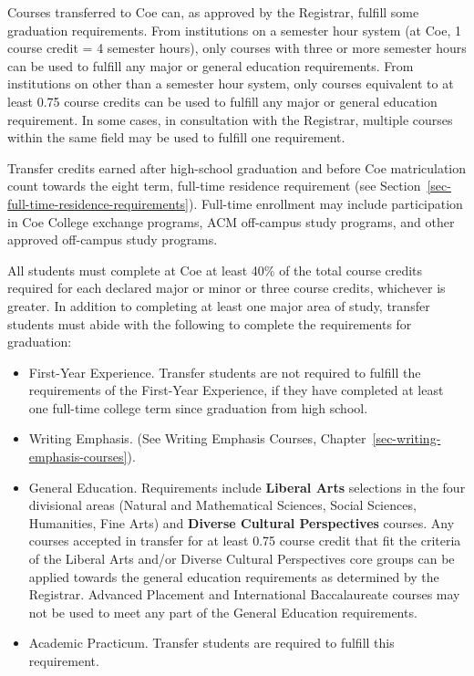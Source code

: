 \documentclass[
  letterpaper,
]{scrbook}
\providecommand{\tightlist}{%
  \setlength{\itemsep}{0pt}\setlength{\parskip}{0pt}}
\begin{document}
Courses transferred to Coe can, as approved by the Registrar, fulfill
some graduation requirements. From institutions on a semester hour
system (at Coe, 1 course credit = 4 semester hours), only courses with
three or more semester hours can be used to fulfill any major or general
education requirements. From institutions on other than a semester hour
system, only courses equivalent to at least 0.75 course credits can be
used to fulfill any major or general education requirement. In some
cases, in consultation with the Registrar, multiple courses within the
same field may be used to fulfill one requirement.

Transfer credits earned after high-school graduation and before Coe
matriculation count towards the eight term, full-time residence
requirement (see Section~\ref{sec-full-time-residence-requirements}).
Full-time enrollment may include participation in Coe College exchange
programs, ACM off-campus study programs, and other approved off-campus
study programs.

All students must complete at Coe at least 40\% of the total course
credits required for each declared major or minor or three course
credits, whichever is greater. In addition to completing at least one
major area of study, transfer students must abide with the following to
complete the requirements for graduation:

\begin{itemize}
\tightlist
\item
  First-Year Experience. Transfer students are not required to fulfill
  the requirements of the First-Year Experience, if they have completed
  at least one full-time college term since graduation from high school.
\item
  Writing Emphasis. (See Writing Emphasis Courses,
  Chapter~\ref{sec-writing-emphasis-courses}).
\item
  General Education. Requirements include \textbf{Liberal Arts}
  selections in the four divisional areas (Natural and Mathematical
  Sciences, Social Sciences, Humanities, Fine Arts) and \textbf{Diverse
  Cultural Perspectives} courses. Any courses accepted in transfer for
  at least 0.75 course credit that fit the criteria of the Liberal Arts
  and/or Diverse Cultural Perspectives core groups can be applied
  towards the general education requirements as determined by the
  Registrar. Advanced Placement and International Baccalaureate courses
  may not be used to meet any part of the General Education
  requirements.
\item
  Academic Practicum. Transfer students are required to fulfill this
  requirement.
\end{itemize}
\end{document}
